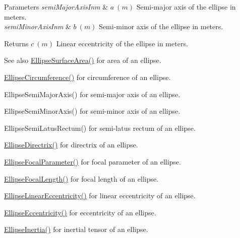 \begin{DoxyParams}{Parameters}
{\em semi\+Major\+Axis\+Inm} & $ a\ (m)$ Semi-\/major axis of the ellipse in meters. \\
\hline
{\em semi\+Minor\+Axis\+Inm} & $ b\ (m)$ Semi-\/minor axis of the ellipse in meters. \\
\hline
\end{DoxyParams}
\begin{DoxyReturn}{Returns}
$ c\ (m)$ Linear eccentricity of the ellipse in meters. 
\end{DoxyReturn}
\begin{DoxySeeAlso}{See also}
\mbox{\hyperlink{group___e_g_x_math-_geometry-2_d-_ellipse-_surface_area_ga4ce8c8323e9718ce5458f4ab7f6d823d}{Ellipse\+Surface\+Area()}} for area of an ellipse. 

\mbox{\hyperlink{group___e_g_x_math-_geometry-2_d-_ellipse-_circumference_ga4172802ac674eb53467b44928ac635c7}{Ellipse\+Circumference()}} for circumference of an ellipse. 

Ellipse\+Semi\+Major\+Axis() for semi-\/major axis of an ellipse. 

Ellipse\+Semi\+Minor\+Axis() for semi-\/minor axis of an ellipse. 

Ellipse\+Semi\+Latus\+Rectum() for semi-\/latus rectum of an ellipse. 

\mbox{\hyperlink{group___e_g_x_math-_geometry-2_d-_ellipse-_directrix_gace8f72a8efbc9c18d3eb689151405106}{Ellipse\+Directrix()}} for directrix of an ellipse. 

\mbox{\hyperlink{group___e_g_x_math-_geometry-2_d-_ellipse-_focal_parameter_ga4cd01a38c72c092ef9791351948bf69b}{Ellipse\+Focal\+Parameter()}} for focal parameter of an ellipse. 

\mbox{\hyperlink{group___e_g_x_math-_geometry-2_d-_ellipse-_focal_length_gab8d63de7640c880cfecaeada6f2afdac}{Ellipse\+Focal\+Length()}} for focal length of an ellipse. 

\mbox{\hyperlink{group___e_g_x_math-_geometry-2_d-_ellipse-_linear_eccentricity_gac70b3010e30aa8b73deb50fe2b9b9a91}{Ellipse\+Linear\+Eccentricity()}} for linear eccentricity of an ellipse. 

\mbox{\hyperlink{group___e_g_x_math-_geometry-2_d-_ellipse-_eccentricity_ga6a0a7fba17f782616894cfc447628c33}{Ellipse\+Eccentricity()}} for eccentricity of an ellipse. 

\mbox{\hyperlink{group___e_g_x_math-_geometry-2_d-_ellipse-_inertia_ga10a3049c2f04b50f271fb01dc62e4cf8}{Ellipse\+Inertia()}} for inertial tensor of an ellipse. 
\end{DoxySeeAlso}
\mbox{\label{group___e_g_x_math-_geometry-2_d-_ellipse-_linear_eccentricity_gad768e5a198895dd2646b190b7d3208de}} 

